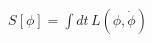 \documentclass[preview]{standalone}
\begin{document}
\begin{align*}
S[\phi] = \int dt \, L(\phi, \dot{\phi})
\end{align*}
\end{document}
